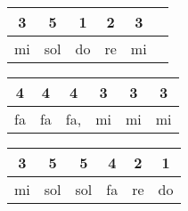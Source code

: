 \documentclass[11pt]{article}
\begin{document}
\begin{center}
\begin{tabular}{|*{6}{c|}}
\hline
3  &  5  &  1  &  2  &  3  &  \\ \hline 
mi  &  sol  &  do   &  re  &  mi  &  \\ \hline 
\end{tabular}
\end{center}


\begin{center}
\begin{tabular}{|*{6}{c|}}
\hline
4  &  4  &  4  &  3  &  3  &  3  \\ \hline 
fa  &  fa  &  fa,  &  mi   &  mi  &  mi   \\ \hline 
\end{tabular}
\end{center}


\begin{center}
\begin{tabular}{|*{6}{c|}}
\hline
3  &  5  &  5  &  4  &  2  &  1  \\ \hline 
mi  &  sol  &  sol  &  fa   &  re  &   do  \\ \hline 
\end{tabular}
\end{center}
\end{document}
